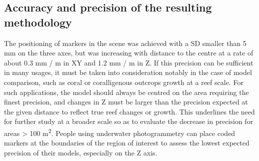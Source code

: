 \subsection{Accuracy and precision of the resulting methodology}\label{chapitre1_4.2}
The positioning of markers in the scene was achieved with a SD smaller than 5 mm on the three axes, but was increasing with distance to the centre at a rate of about 0.3 mm / m in XY and 1.2 mm / m in Z. If this precision can be sufficient in many usages, it must be taken into consideration notably in the case of model comparison, such as coral or coralligenous outcrops growth at a reef scale. For such applications, the model should always be centred on the area requiring the finest precision, and changes in Z must be larger than the precision expected at the given distance to reflect true reef changes or growth. This underlines the need for further study at a broader scale so as to evaluate the decrease in precision for areas > 100 m\textsuperscript{2}. People using underwater photogrammetry can place coded markers at the boundaries of the region of interest to assess the lowest expected precision of their models, especially on the Z axis.

